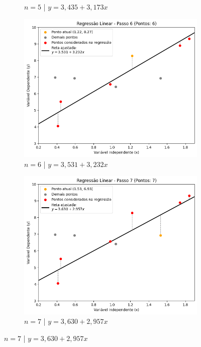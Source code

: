 \begin{figure}[H]
\begin{subfigure}{0.4\textwidth}
		\caption{$n = 5$ | $y = 3,435 + 3,173x$}
		\label{fig:intervalo_aplicacao_rls}
	\end{subfigure}
	\label{fig:mqo_5}
	\begin{subfigure}{0.4\textwidth} 
		\includegraphics[width=\linewidth]{figuras/RL_step_6.png}
		\caption{$n = 6$ | $y = 3,531 + 3,232x$}
		\label{fig:intervalo_aplicacao_rls}
	\end{subfigure}
	\label{fig:mqo_6}
	\begin{subfigure}{0.4\textwidth} 
		\includegraphics[width=\linewidth]{figuras/RL_step_7.png}
		\caption{$n = 7$ | $y = 3,630 + 2,957x$}
		\label{fig:intervalo_aplicacao_rls}

\end{subfigure}
\end{figure}
